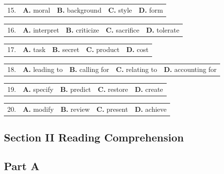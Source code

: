 \documentclass[UTF8,11pt]{ctexart}
\begin{document}
\noindent\begin{tabularx}{\linewidth}{@{}lXXXX@{}}15. & \textbf{A.} moral & \textbf{B.} background & \textbf{C.} style & \textbf{D.} form\\\end{tabularx}\par

\noindent\begin{tabularx}{\linewidth}{@{}lXXXX@{}}16. & \textbf{A.} interpret & \textbf{B.} criticize & \textbf{C.} sacrifice & \textbf{D.} tolerate\\\end{tabularx}\par

\noindent\begin{tabularx}{\linewidth}{@{}lXXXX@{}}17. & \textbf{A.} task & \textbf{B.} secret & \textbf{C.} product & \textbf{D.} cost\\\end{tabularx}\par

\noindent\begin{tabularx}{\linewidth}{@{}lXXXX@{}}18. & \textbf{A.} leading to & \textbf{B.} calling for & \textbf{C.} relating to & \textbf{D.} accounting for\\\end{tabularx}\par

\noindent\begin{tabularx}{\linewidth}{@{}lXXXX@{}}19. & \textbf{A.} specify & \textbf{B.} predict & \textbf{C.} restore & \textbf{D.} create\\\end{tabularx}\par

\noindent\begin{tabularx}{\linewidth}{@{}lXXXX@{}}20. & \textbf{A.} modify & \textbf{B.} review & \textbf{C.} present & \textbf{D.} achieve\\\end{tabularx}\par

\subsection*{\textbf{Section II} \textbf{Reading Comprehension}}


\subsection*{\textbf{Part A}}
\end{document}
